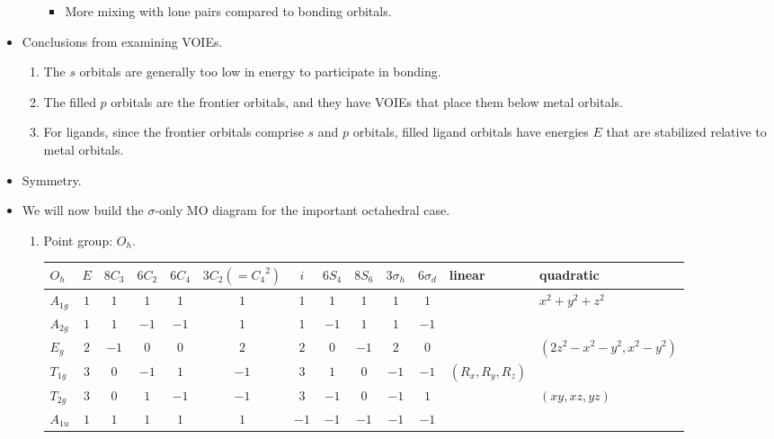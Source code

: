 \documentclass[../notes.tex]{subfiles}
\begin{document}
\begin{itemize}
\begin{itemize}
\begin{itemize}
            \item More mixing with lone pairs compared to bonding orbitals.
        \end{itemize}
    \end{itemize}
    \item Conclusions from examining VOIEs.
    \begin{enumerate}
        \item The $s$ orbitals are generally too low in energy to participate in bonding.
        \item The filled $p$ orbitals are the frontier orbitals, and they have VOIEs that place them below metal orbitals.
        \item For ligands, since the frontier orbitals comprise $s$ and $p$ orbitals, filled ligand orbitals have energies $E$ that are stabilized relative to metal orbitals.
    \end{enumerate}
    \item Symmetry.
    \item We will now build the $\sigma$-only MO diagram for the important  octahedral case.
    \begin{enumerate}
        \item Point group: $O_h$.
        \begin{table}[H]
            \centering
            \small
            \renewcommand{\arraystretch}{1.2}
            \begin{tabular}{l|cccccccccc|l|l}
                $O_h$ & $E$ & $8C_3$ & $6C_2$ & $6C_4$ & $3C_2(={C_4}^2)$ & $i$ & $6S_4$ & $8S_6$ & $3\sigma_h$ & $6\sigma_d$ & linear & quadratic\\
                \hline
                $A_{1g}$ & $1$ & $1$  & $1$  & $1$  & $1$  & $1$  & $1$  & $1$  & $1$  & $1$  & & $x^2+y^2+z^2$\\
                $A_{2g}$ & $1$ & $1$  & $-1$ & $-1$ & $1$  & $1$  & $-1$ & $1$  & $1$  & $-1$ & & \\
                $E_g$    & $2$ & $-1$ & $0$  & $0$  & $2$  & $2$  & $0$  & $-1$ & $2$  & $0$  & & $(2z^2-x^2-y^2,x^2-y^2)$\\
                $T_{1g}$ & $3$ & $0$  & $-1$ & $1$  & $-1$ & $3$  & $1$  & $0$  & $-1$ & $-1$ & $(R_x,R_y,R_z)$ & \\
                $T_{2g}$ & $3$ & $0$  & $1$  & $-1$ & $-1$ & $3$  & $-1$ & $0$  & $-1$ & $1$  & & $(xy,xz,yz)$\\
                $A_{1u}$ & $1$ & $1$  & $1$  & $1$  & $1$  & $-1$ & $-1$ & $-1$ & $-1$ & $-1$ & & \\

\end{tabular}
\end{table}
\end{enumerate}
\end{itemize}
\end{document}
